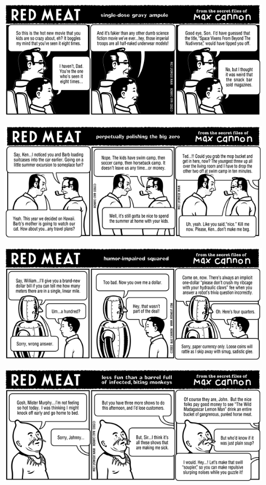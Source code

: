 \documentclass[a4paper,twoside,11pt]{article}
\begin{document}
\includegraphics[width=\textwidth]{redmeat_2003-07-08.png}



\includegraphics[width=\textwidth]{redmeat_2003-07-15.png}



\includegraphics[width=\textwidth]{redmeat_2003-07-22.png}



\includegraphics[width=\textwidth]{redmeat_2003-07-29.png}
\end{document}
